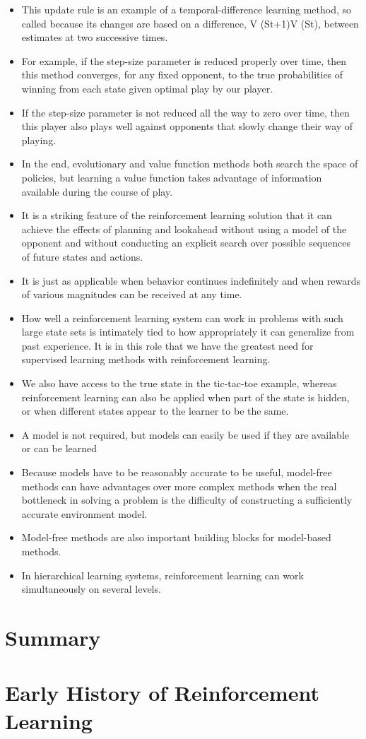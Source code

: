 \documentclass{article}
\begin{document}
\begin{itemize}
    \item This update rule is an example of a temporal-difference learning method, so called because its changes are based on a difference, V (St+1)\textminus V (St), between estimates at two successive times.
    \item For example, if the step-size parameter is reduced properly over time, then this method converges, for any fixed opponent, to the true probabilities of winning from each state given optimal play by our player.
    \item If the step-size parameter is not reduced all the way to zero over time, then this player also plays well against opponents that slowly change their way of playing.
    \item In the end, evolutionary and value function methods both search the space of policies, but learning a value function takes advantage of information available during the course of play.
    \item It is a striking feature of the reinforcement learning solution that it can achieve the effects of planning and lookahead without using a model of the opponent and without conducting an explicit search over possible sequences of future states and actions.
    \item It is just as applicable when behavior continues indefinitely and when rewards of various magnitudes can be received at any time.
    \item How well a reinforcement learning system can work in problems with such large state sets is intimately tied to how appropriately it can generalize from past experience. It is in this role that we have the greatest need for supervised learning methods with reinforcement learning.
    \item We also have access to the true state in the tic-tac-toe example, whereas reinforcement learning can also be applied when part of the state is hidden, or when different states appear to the learner to be the same.
    \item A model is not required, but models can easily be used if they are available or can be learned
    \item Because models have to be reasonably accurate to be useful, model-free methods can have advantages over more complex methods when the real bottleneck in solving a problem is the difficulty of constructing a sufficiently accurate environment model.
    \item Model-free methods are also important building blocks for model-based methods.
    \item In hierarchical learning systems, reinforcement learning can work simultaneously on several levels.
\end{itemize}

\section{Summary}

\section{Early History of Reinforcement Learning}
\end{document}
